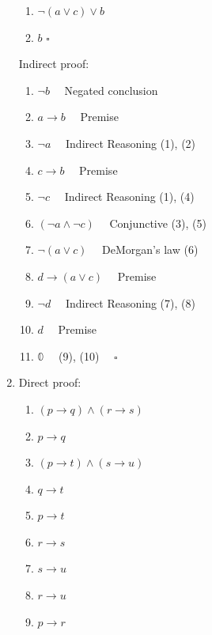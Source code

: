 \documentclass[10pt,]{book}
\theoremstyle{plain}
\theoremstyle{definition}
\theoremstyle{definition}
\theoremstyle{definition}
\theoremstyle{definition}
\begin{document}
\begin{exercisegroup}
\begin{enumerate}[label=\alph*]
\begin{enumerate}[label=\arabic*]
\item\hypertarget{li-135}{} \(\neg (a\lor c)\lor b\)%
\item\hypertarget{li-136}{} \(b\) \(\square\)%
\end{enumerate}
%
\par
Indirect proof:%
\par
%
\begin{enumerate}[label=\arabic*]
\item\hypertarget{li-137}{} \(\neg b\quad \)   Negated conclusion%
\item\hypertarget{li-138}{} \(a\to b\quad \)    Premise%
\item\hypertarget{li-139}{} \(\neg a\quad \)   Indirect Reasoning (1), (2)%
\item\hypertarget{li-140}{} \(c\to b\quad \)   Premise%
\item\hypertarget{li-141}{} \(\neg c\quad \)     Indirect Reasoning (1), (4)%
\item\hypertarget{li-142}{} \((\neg a\land \neg c)\quad \)     Conjunctive (3), (5)%
\item\hypertarget{li-143}{} \(\neg (a\lor c)\quad \)   DeMorgan's law (6)%
\item\hypertarget{li-144}{} \(d\to (a\lor c)\quad \)    Premise%
\item\hypertarget{li-145}{} \(\neg d\quad \)    Indirect Reasoning (7), (8)%
\item\hypertarget{li-146}{} \(d\quad \)  Premise%
\item\hypertarget{li-147}{} \(\mathbb{0} \quad \)  (9), (10) \(\quad \square\)%
\end{enumerate}
%
\item\hypertarget{li-148}{}Direct proof:%
\par
%
\begin{enumerate}[label=\arabic*]
\item\hypertarget{li-149}{} \((p\to q)\land (r\to s)\)%
\item\hypertarget{li-150}{} \(p\to q\)%
\item\hypertarget{li-151}{} \((p\to t)\land (s\to u)\)%
\item\hypertarget{li-152}{} \(q\to t\)%
\item\hypertarget{li-153}{} \(p\to t\)%
\item\hypertarget{li-154}{} \(r\to s\)%
\item\hypertarget{li-155}{} \(s\to u\)%
\item\hypertarget{li-156}{} \(r\to u\)%
\item\hypertarget{li-157}{} \(p\to r\)%

\end{enumerate}
\end{enumerate}
\end{exercisegroup}
\end{document}
